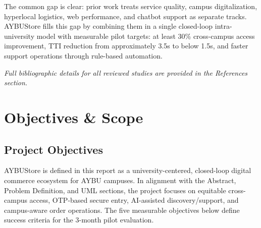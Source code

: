 \documentclass[11pt,a4paper]{article}
\begin{document}
The common gap is clear: prior work treats service quality, campus digitalization, hyperlocal logistics, web performance, and chatbot support as separate tracks. AYBUStore fills this gap by combining them in a single closed-loop intra-university model with measurable pilot targets: at least 30\% cross-campus access improvement, TTI reduction from approximately 3.5s to below 1.5s, and faster support operations through rule-based automation.
 
\textit{Full bibliographic details for all reviewed studies are provided in the References section.}
 
\newpage
\section{Objectives \& Scope}
\label{sec:objectives-scope}
 
\subsection{Project Objectives}
AYBUStore is defined in this report as a university-centered,
closed-loop digital commerce ecosystem for AYBU campuses. In alignment
with the Abstract, Problem Definition, and UML sections, the project
focuses on equitable cross-campus access, OTP-based secure entry,
AI-assisted discovery/support, and campus-aware order operations.
The five measurable objectives below define success criteria for the
3-month pilot evaluation.
 
\end{document}
